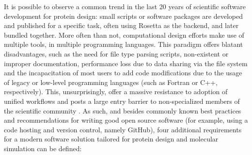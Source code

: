 \documentclass{juliacon}
\begin{document}
It is possible to observe a common trend in the last 20 years of scientific software development for protein design: small scripts or software packages are developed and published for a specific task, often using Rosetta as the backend, and later bundled together. More often than not, computational design efforts make use of multiple tools, in multiple programming languages. This paradigm offers blatant disadvantages, such as the need for file type parsing scripts, non-existent or improper documentation, performance loss due to data sharing via the file system and the incapacitation of most users to add code modifications due to the usage of legacy or low-level programming languages (such as Fortran or C++, respectively). This, unsurprisingly, offer a massive resistance to adoption of unified workflows and posts a large entry barrier to non-specialized members of the scientific community \cite{Samish2017}. 
As such, and besides commonly known best practices and recommendations for writing good open source software \cite{Sarhan2019} (for example, using a code hosting and version control, namely GitHub), four additional requirements for a modern software solution tailored for protein design and molecular simulation can be defined:
\end{document}
